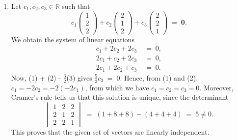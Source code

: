 \documentclass[10pt]{article}
\let\vec\mathbf
\begin{document}
\begin{enumerate}
                \item Let $c_1, c_2, c_3 \in \mathbb{R}$ such that
                \[
                c_1\begin{pmatrix}1\\2\\2\end{pmatrix} +
                c_2\begin{pmatrix}2\\1\\2\end{pmatrix} +
                c_3\begin{pmatrix}2\\2\\1\end{pmatrix} \;=\; \vec{0}.
                \]
                We obtain the system of linear equations
                \begin{align*}
                        c_1 + 2c_2 + 2c_3 \;&=\; 0, \tag{1}\\
                        2c_1 + c_2 + 2c_3 \;&=\; 0, \tag{2}\\
                        2c_1 + 2c_2 + c_3 \;&=\; 0. \tag{3}
                \end{align*}
                Now, (1) + (2) - $\frac{3}{2}$(3) gives $\frac{5}{2}c_3 \;=\; 0$. Hence, from (1) and (2), $c_1 = -2c_2 = -2(-2c_1)$, from
                which we have $c_1 = c_2 = c_3 = 0$. 
                Moreover, Cramer's rule tells us that this solution is unique, since the determinant
                \[
                \begin{vmatrix}
                        1 & 2 & 2 \\ 2 & 1 & 2\\ 2 & 2 & 1
                \end{vmatrix} \;=\; (1 + 8 + 8) - (4 + 4 + 4) \;=\; 5 \neq 0.
                \]
                This proves that the given set of vectors are linearly independent.
                

\end{enumerate}
\end{document}
